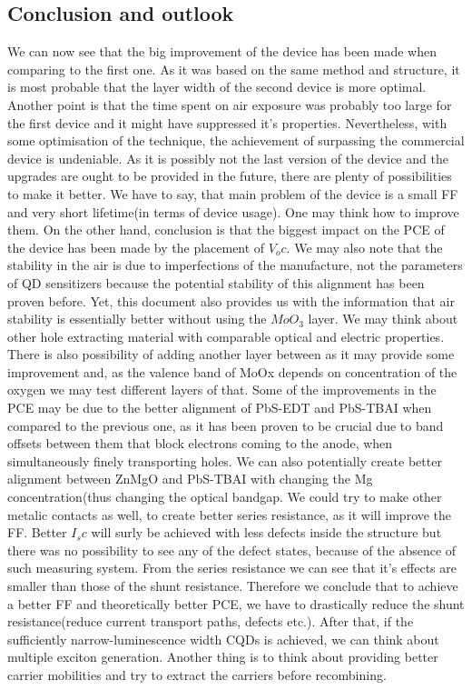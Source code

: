 \subsection{Conclusion and outlook}

We can now see that the big improvement of the device has been made when comparing to the first one. As it was based on the same method and structure, it is most probable that the layer width of the second device is more optimal. Another point is that the time spent on air exposure was probably too large for the first device and it might have suppressed it's properties. Nevertheless, with some optimisation of the technique, the achievement of surpassing the commercial device is undeniable. As it is possibly not the last version of the device and the upgrades are ought to be provided in the future, there are plenty of possibilities to make it better. We have to say, that main problem of the device is a small FF and very short lifetime(in terms of device usage). One may think how to improve them. On the other hand, conclusion is that the biggest impact on the PCE of the device has been made by the placement of $V_oc$. We may also note that the stability in the air is due to imperfections of the manufacture, not the parameters of QD sensitizers because the potential stability of this alignment has been proven before\cite{Chuang2014}. Yet, this document also provides us with the information that air stability is essentially better without using the $MoO_3$ layer. We may think about other hole extracting material with comparable optical and electric properties. There is also possibility of adding another layer between as it may provide some improvement and, as the valence band of MoOx depends on concentration of the oxygen we may test different layers of that. Some of the improvements in the PCE may be due to the better alignment of PbS-EDT and PbS-TBAI when compared to the previous one, as it has been proven to be crucial due to band offsets between them that block electrons coming to the anode, when simultaneously finely transporting holes. We can also potentially create better alignment between ZnMgO and PbS-TBAI with changing the Mg concentration(thus changing the optical bandgap. We could try to make other metalic contacts as well, to create better series resistance, as it will improve the FF. Better $I_sc$ will surly be achieved with less defects inside the structure but there was no possibility to see any of the defect states,  because of the absence of such measuring system. From the series resistance we can see that it's effects are smaller than those of the shunt resistance. Therefore we conclude that to achieve a better FF and theoretically better PCE, we have to drastically reduce the shunt resistance(reduce current transport paths, defects etc.). After that, if the sufficiently narrow-luminescence width CQDs is achieved, we can think about multiple exciton generation. Another thing is to think about providing better carrier mobilities and try to extract the carriers before recombining. 